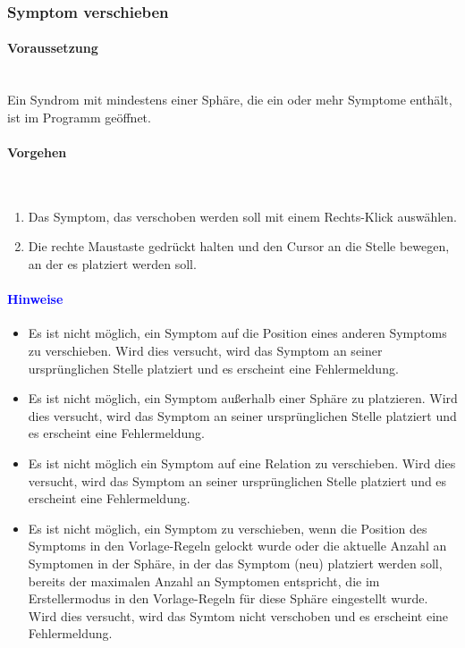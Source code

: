 \documentclass[enabledeprecatedfontcommands,fontsize=11pt,paper=a4,twoside]{scrartcl}
\newcommand*{\hint}{\paragraph{\textcolor{blue}{Hinweise}}}
\newcommand*{\condition}{\paragraph{Voraussetzung}$\;$ \vspace{0.2cm}\\}
\newcommand*{\actions}{\paragraph{Vorgehen} $\;$\vspace{0.2cm}\\}
\begin{document}
		\subsubsection{Symptom verschieben}
					\condition 	
		Ein Syndrom mit mindestens einer Sphäre, die ein oder mehr Symptome enthält, ist im Programm geöffnet. 
		\actions
		\begin{enumerate}
			\item Das Symptom, das verschoben werden soll mit einem Rechts-Klick auswählen. 
			\item Die rechte Maustaste gedrückt halten und den Cursor an die Stelle bewegen, an der es platziert werden soll.
		\end{enumerate}
		\hint
		\begin{itemize}
			\item Es ist nicht möglich, ein Symptom auf die Position eines anderen Symptoms zu verschieben. Wird dies versucht, wird das Symptom an seiner ursprünglichen Stelle platziert und es erscheint eine Fehlermeldung.
			\item Es ist nicht möglich, ein Symptom außerhalb einer Sphäre zu platzieren. Wird dies versucht, wird das Symptom an seiner ursprünglichen Stelle platziert und es erscheint eine Fehlermeldung.
			\item Es ist nicht möglich ein Symptom auf eine Relation zu verschieben. Wird dies versucht, wird das Symptom an seiner ursprünglichen Stelle platziert und es erscheint eine Fehlermeldung.
			\item Es ist nicht möglich, ein Symptom zu verschieben, wenn die Position des Symptoms in den Vorlage-Regeln gelockt wurde oder die aktuelle Anzahl an Symptomen in der Sphäre, in der das Symptom (neu) platziert werden soll, bereits der maximalen Anzahl an Symptomen entspricht, die im Erstellermodus in den Vorlage-Regeln für diese Sphäre eingestellt wurde. Wird dies versucht, wird das Symtom nicht verschoben und es erscheint eine Fehlermeldung.
		\end{itemize}
		
				\newpage	
\end{document}
